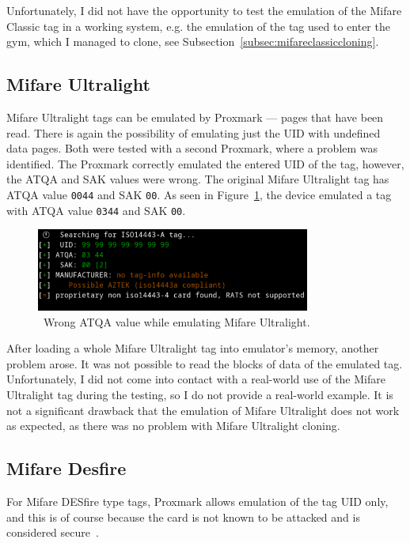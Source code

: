 Unfortunately, I did not have the opportunity to test the emulation of the Mifare Classic tag in a working system, e.g. the emulation of the tag used to enter the gym, which I managed to clone, see Subsection~\ref{subsec:mifareclassiccloning}.

\subsection{Mifare Ultralight}

Mifare Ultralight tags can be emulated by Proxmark --- pages that have been read. There is again the possibility of emulating just the UID with undefined data pages. Both were tested with a second Proxmark, where a problem was identified. The Proxmark correctly emulated the entered UID of the tag, however, the ATQA and SAK values were wrong. The original Mifare Ultralight tag has ATQA value \texttt{0044} and SAK \texttt{00}. As seen in Figure~\ref{fig:emulatedidultralight}, the device emulated a tag with ATQA value \texttt{0344} and SAK \texttt{00}.

\begin{figure}[ht]
  \centering
  \includegraphics[width=9cm]{text/testing/id_ultralight_wrong _atqa.png}
  \caption{~Wrong ATQA value while emulating Mifare Ultralight.}
  \label{fig:emulatedidultralight}
\end{figure}

After loading a whole Mifare Ultralight tag into emulator's memory, another problem arose. It was not possible to read the blocks of data of the emulated tag. Unfortunately, I did not come into contact with a real-world use of the Mifare Ultralight tag during the testing, so I do not provide a real-world example. It is not a significant drawback that the emulation of Mifare Ultralight does not work as expected, as there was no problem with Mifare Ultralight cloning.

\subsection{Mifare Desfire}
For Mifare DESfire type tags, Proxmark allows emulation of the tag UID only, and this is of course because the card is not known to be attacked and is considered secure~\cite{preucil2023surveying}. 

